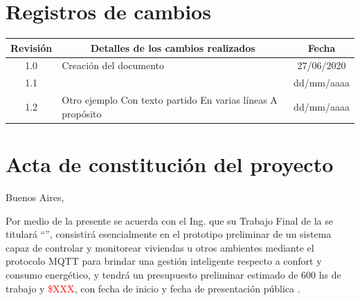 \documentclass[11pt]{charter}
\begin{document}
\maketitle
\thispagestyle{empty}
\pagebreak


\thispagestyle{empty}
{\setlength{\parskip}{0pt}
\tableofcontents{}
}
\pagebreak


\section{Registros de cambios}
\label{sec:registro}


\begin{table}[ht]
\label{tab:registro}
\centering
\begin{tabularx}{\linewidth}{@{}|c|X|c|@{}}
\hline
\rowcolor[HTML]{C0C0C0} 
Revisión & \multicolumn{1}{c|}{\cellcolor[HTML]{C0C0C0}Detalles de los cambios realizados} & Fecha      \\ \hline
1.0      & Creación del documento                                          & 27/06/2020 \\ \hline
1.1      &                                                                 & dd/mm/aaaa \\ \hline
1.2      & Otro ejemplo \newline
		   Con texto partido \newline
		   En varias líneas \newline
		   A propósito                                                     & dd/mm/aaaa \\ \hline
\end{tabularx}
\end{table}

\pagebreak



\section{Acta de constitución del proyecto}
\label{sec:acta}

\begin{flushright}
Buenos Aires, \fechaInicioName
\end{flushright}

\vspace{2cm}

Por medio de la presente se acuerda con el Ing. \authorname\hspace{1px} que su Trabajo Final de la \degreename\hspace{1px} se titulará ``\ttitle'', consistirá esencialmente en el prototipo preliminar de un sistema capaz de controlar y monitorear viviendas u otros ambientes mediante el protocolo MQTT para brindar una gestión inteligente respecto a confort y consumo energético, y tendrá un presupuesto preliminar estimado de 600 hs de trabajo y \textcolor{red}{\$XXX}, con fecha de inicio \fechaInicioName\hspace{1px} y fecha de presentación pública \fechaFinalName.
\end{document}
